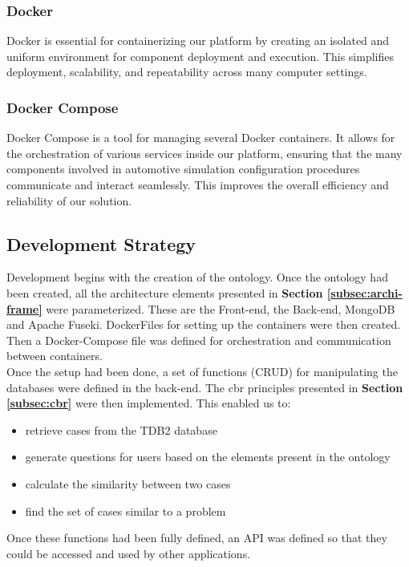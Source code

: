     \subsubsection{Docker}
    Docker is essential for containerizing our platform by creating an isolated and uniform environment for component deployment and execution. This simplifies deployment, scalability, and repeatability across many computer settings.
    
    \subsubsection{Docker Compose}
    Docker Compose is a tool for managing several Docker containers. It allows for the orchestration of various services inside our platform, ensuring that the many components involved in automotive simulation configuration procedures communicate and interact seamlessly. This improves the overall efficiency and reliability of our solution.

    
\subsection{Development Strategy}
Development begins with the creation of the ontology. Once the ontology had been created, all the architecture elements presented in \textbf{Section \ref{subsec:archi-frame}} were parameterized. These are the Front-end, the Back-end, MongoDB and Apache Fuseki. DockerFiles for setting up the containers were then created. Then a Docker-Compose file was defined for orchestration and communication between containers.\\

Once the setup had been done, a set of functions (CRUD) for manipulating the databases were defined in the back-end. The \acrshort{cbr} principles presented in \textbf{Section \ref{subsec:cbr}} were then implemented. This enabled us to:
\begin{itemize}
    \item retrieve cases from the TDB2 database
    \item generate questions for users based on the elements present in the ontology
    \item calculate the similarity between two cases
    \item find the set of cases similar to a problem
\end{itemize}

Once these functions had been fully defined, an API was defined so that they could be accessed and used by other applications.

